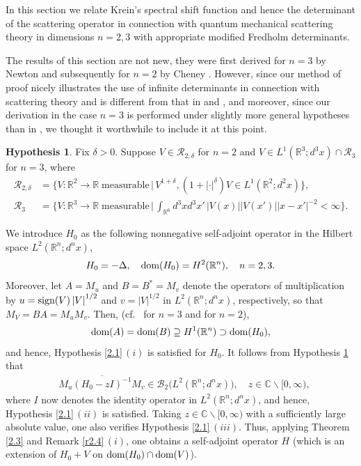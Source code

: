 \documentclass[reqno,10pt, centertags]{amsart}
\newcommand{\bbR}{{\mathbb{R}}}
\newcommand{\bbC}{{\mathbb{C}}}
\newcommand{\cB}{{\mathcal B}}
\newcommand{\cR}{{\mathcal R}}
\newcommand{\abs}[1]{\left\lvert#1\right\rvert}
\newcommand{\lb}{\label}
\newcommand{\ol}{\overline}
\newcommand{\dom}{\text{\rm{dom}}}
\newcommand{\sgn}{\text{\rm{sign}}}
\numberwithin{equation}{section}
\theoremstyle{definition}
\newtheorem{hypothesis}[theorem]{Hypothesis}
\begin{document}
In this section we relate Krein's spectral shift function and hence the
determinant of the scattering operator in connection with quantum
mechanical scattering theory in dimensions $n=2,3$ with appropriate
modified Fredholm determinants.

The results of this section are not new, they were first derived for
$n=3$ by Newton \cite{Ne77} and subsequently for $n=2$ by Cheney
\cite{Ch84}. However, since our method of proof nicely illustrates
the use of infinite determinants in connection with scattering theory and
is different from that in \cite{Ne77} and \cite{Ch84}, and
moreover, since our derivation in the case $n=3$ is performed under
slightly more general hypotheses than in \cite{Ne77}, we thought it
worthwhile to include it at this point.

\begin{hypothesis} \lb{h7.1}
Fix $\delta>0$. Suppose $V\in \cR_{2,\delta}$ for $n=2$ and $V\in
L^1(\bbR^3;d^3 x)\cap\cR_3$ for $n=3$, where
\begin{align}
\cR_{2,\delta}&=\big\{V\colon \bbR^2\to\bbR \;\text{measurable}\,\big|\,
V^{1+\delta}, (1+|\cdot|^{\delta})V \in L^1(\bbR^2; d^2x)\big\}, \\
\cR_3&=\bigg\{V\colon \bbR^3\to\bbR\; \text{measurable}\,\bigg|\,
\int_{\bbR^6}  d^3 x d^3 x' \,
|V(x)||V(x')||x-x'|^{-2}<\infty\bigg\}.
\end{align}
\end{hypothesis}

We introduce $H_0$ as the following nonnegative self-adjoint operator in
the Hilbert space $L^2(\bbR^n;d^nx)$,
\begin{equation}
H_0 = -\Delta, \quad \dom(H_0) = H^{2}(\bbR^n), \quad n=2,3.
\end{equation}
Moreover, let $A=M_u$ and $B=B^*=M_v$ denote the operators of
multiplication by
$u=\sgn(V)\abs{V}^{1/2}$ and $v=\abs{V}^{1/2}$ in
$L^2(\bbR^n;d^nx)$, respectively, so that $M_V=B A=M_u M_v$.  Then, (cf.\
\cite[Theorem I.21]{Si71} for
$n=3$ and
\cite{Si76} for $n=2$),
\begin{align}
\dom(A)=\dom(B) \supseteq H^{1}(\bbR^n)\supset \dom(H_0), \lb{7.3A}
\end{align}
and hence, Hypothesis \ref{2.1}\,$(i)$ is satisfied for $H_0$. It
follows from Hypothesis \ref{h7.1} that
\begin{align}
&\ol{M_u(H_0-zI)^{-1}M_v}\in\cB_2\big(L^2(\bbR^n;d^nx)\big),  \quad
z\in\bbC\backslash [0,\infty),  \lb{7.4}
\end{align}
where $I$ now denotes the identity operator in $L^2(\bbR^n;d^nx)$, and
hence, Hypothesis \ref{2.1}\,$(ii)$ is satisfied. Taking
$z\in\bbC\backslash[0,\infty)$ with a sufficiently large absolute
value, one also verifies Hypothesis \ref{2.1}\,$(iii)$. Thus, applying
Theorem \ref{2.3} and Remark \ref{r2.4}\,$(i)$, one obtains a
self-adjoint  operator $H$ (which is an extension of $H_0+V$ on
$\dom(H_0)\cap\dom(V)$).
\end{document}

